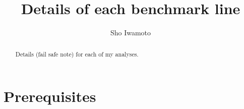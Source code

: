 \documentclass[a4paper,10pt,captions=tableheading,DIV=14]{scrartcl}
\author{Sho Iwamoto}
\title{Details of each benchmark line}
\numberwithin{equation}{section}
\begin{document}
\begin{center}{\makeatletter
{\huge{}\@title}\par\vspace{2em}
{\Large \@author}\par\vspace{2em}
}
\begin{abstract}\noindent
Details (fail safe note) for each of my analyses.
\end{abstract}
\end{center}


\section{Prerequisites}
\end{document}
